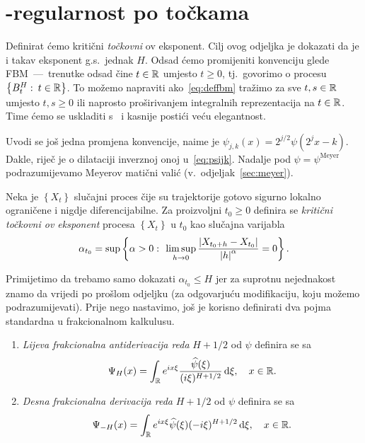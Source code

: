 \documentclass[main.tex]{subfiles}
\begin{document}
\nocite{*}

\section{\holder -regularnost po točkama}\label{sec:holpo}
Definirat ćemo kritični \emph{točkovni} \holder ov eksponent.
Cilj ovog odjeljka je dokazati da je i takav eksponent g.s.\ jednak \( H \). Odsad ćemo promijeniti konvenciju glede FBM~---~trenutke
odsad čine \( t \in \mathbb{R} \) umjesto \( t \ge 0 \), tj.\ govorimo
o procesu \( \left\{ B^H_t \, \colon \, t \in \mathbb{R} \right\} \).
To možemo napraviti ako~\eqref{eq:deffbm} tražimo
za sve \( t,s \in \mathbb{R} \) umjesto \( t,s \ge 0 \) ili
naprosto proširivanjem integralnih reprezentacija na \( t \in \mathbb{R} \).
Time ćemo se uskladiti s~\cite{ayache} i kasnije
postići veću elegantnost.

Uvodi se još jedna promjena konvencije, naime je \( \psi_{j,k}(x) = 2^{j/2}\psi(2^jx-k) \). Dakle, riječ je o dilataciji inverznoj onoj u~\eqref{eq:psijk}.
Nadalje pod \( \psi = \psi^{\mathrm{Meyer}}\) podrazumijevamo
Meyerov matični valić (v.~odjeljak~\ref{sec:meyer}).


\begin{definicija}\label{def:holpo}
	Neka je \( \left\{ X_t \right\} \) slučajni proces čije su trajektorije gotovo sigurno
	lokalno ograničene i nigdje diferencijabilne. Za proizvoljni
	\( t_0 \ge 0 \) definira se \emph{kritični točkovni \holder ov eksponent} procesa
	\( \left\{ X_t \right\} \) u \( t_0 \) kao slučajna varijabla
	\begin{equation}
		\alpha_{t_0} = \sup \left\{ \alpha > 0 \, \colon \,
		\limsup\limits_{h \rightarrow 0} \frac{\left| {X_{t_0+h}-X_{t_0}} \right|}{\left| {h} \right|^\alpha} = 0
		\right\}.
	\end{equation}
\end{definicija}

Primijetimo da trebamo samo dokazati \( \alpha_{t_0} \le H \)
jer za suprotnu nejednakost znamo da vrijedi po prošlom odjeljku (za odgovarjuću
modifikaciju, koju možemo podrazumijevati).
Prije nego nastavimo, još je korisno definirati dva pojma
standardna u frakcionalnom kalkulusu.

\begin{definicija}
	\begin{enumerate}
		\item \emph{Lijeva frakcionalna antiderivacija reda} \( H+1/2 \) od \( \psi \) definira se sa
		      \begin{equation}
			      \Psi_H(x) = \int_{\mathbb{R}} e^{ix\xi} \frac{\widehat{\psi}(\xi)}{(i\xi)^{H+1/2}} \,\mathrm d \xi, \quad x \in \mathbb{R}.
		      \end{equation}
		\item \emph{Desna frakcionalna derivacija reda} \( H+1/2 \) od \( \psi \) definira se sa
		      \begin{equation}
			      \Psi_{-H}(x)= \int_{\mathbb{R}} e^{ix\xi}\widehat{\psi}(\xi)(-i\xi)^{H+1/2} \,\mathrm d \xi, \quad x \in \mathbb{R}.
		      \end{equation}
	\end{enumerate}
\end{definicija}
\end{document}
